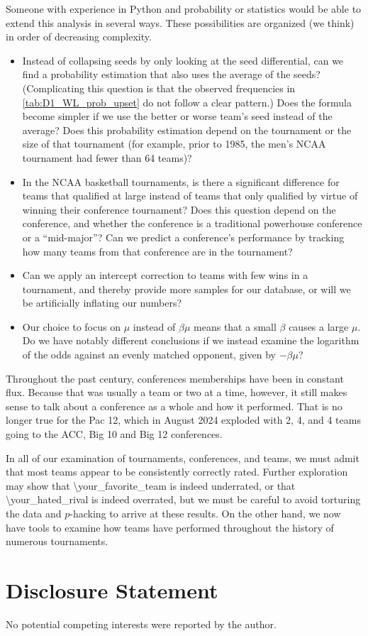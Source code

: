 \documentclass{article}
\begin{document}
Someone with experience in Python and probability or statistics would be able to extend this analysis in several ways.  These possibilities are organized (we think) in order of decreasing complexity.
\begin{itemize}
\item Instead of collapsing seeds by only looking at the seed differential, can we find a probability estimation that also uses the average of the seeds?  (Complicating this question is that the observed frequencies in \autoref{tab:D1_WL_prob_upset} do not follow a clear pattern.)  Does the formula become simpler if we use the better or worse team's seed instead of the average?  Does this probability estimation depend on the tournament or the size of that tournament (for example, prior to 1985, the men's NCAA tournament had fewer than 64 teams)?
\item In the NCAA basketball tournaments, is there a significant difference for teams that qualified at large instead of teams that only qualified by virtue of winning their conference tournament?  Does this question depend on the conference, and whether the conference is a traditional powerhouse conference or a ``mid-major''?  Can we predict a conference's performance by tracking how many teams from that conference are in the tournament?
\item Can we apply an intercept correction to teams with few wins in a tournament, and thereby provide more samples for our database, or will we be artificially inflating our numbers?
\item Our choice to focus on $\mu$ instead of $\beta\mu$ means that a small $\beta$ causes a large $\mu$.  Do we have notably different conclusions if we instead examine the logarithm of the odds against an evenly matched opponent, given by $-\beta\mu$?
\end{itemize}

Throughout the past century, conferences memberships have been in constant flux.  Because that was usually a team or two at a time, however, it still makes sense to talk about a conference as a whole and how it performed.  That is no longer true for the Pac 12, which in August 2024 exploded with 2, 4, and 4 teams going to the ACC, Big 10 and Big 12 conferences.

In all of our examination of tournaments, conferences, and teams, we must admit that most teams appear to be consistently correctly rated.  Further exploration may show that \textbackslash your\_favorite\_team is indeed underrated, or that \textbackslash your\_hated\_rival is indeed overrated, but we must be careful to avoid torturing the data and $p$-hacking to arrive at these results.  On the other hand, we now have tools to examine how teams have performed throughout the history of numerous tournaments.

\section{Disclosure Statement}

No potential competing interests were reported by the author.

\printbibliography[heading=bibintoc]
\end{document}
